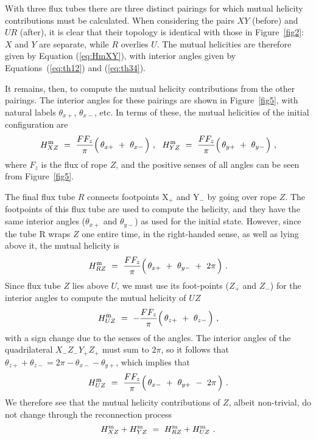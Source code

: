 \documentclass[10pt,namedreferneces]{SolarPhysics}
\begin{document}
\begin{article}
With three flux tubes there are three distinct pairings for which mutual helicity contributions must be calculated.  When considering the pairs $XY$ (before) and $UR$ (after), it is clear that their  topology is identical with those in Figure\ \ref{fig2}: $X$ and $Y$ are separate, while $R$ overlies $U$.  The mutual helicities are therefore given by Equation  (\ref{eq:HmXY}), with interior angles given by Equations\ (\ref{eq:th12}) and (\ref{eq:th34}).  

It remains, then, to compute the mutual helicity contributions from the other pairings.  The interior angles for these pairings are shown in Figure\ \ref{fig5}, with natural labels $\theta_{x+}$, $\theta_{x-}$, etc.  In terms of these, the mutual helicities of the initial configuration are
\begin{equation}
  H^{\rm m}_{XZ} ~=~{FF_z\over \pi}\Bigl(\, \theta_{x+} ~+~ \theta_{x-}\,\Bigr) ~,~~
  H^{\rm m}_{YZ} ~=~{FF_z\over \pi}\Bigl(\, \theta_{y+} ~+~ \theta_{y-}\,\Bigr) ~,
  	\label{eq:HmXZ}
\end{equation}
where $F_z$ is the flux of rope $Z$, and the positive senses of all angles can be seen from Figure\ \ref{fig5}.

The final flux tube $R$ connects footpoints X$_+$ and Y$_-$ by going over rope $Z$.  The footpoints of this flux tube are used to compute the helicity, and they have 
the same interior angles ($\theta_{x+}$ and $\theta_{y-}$) as used for the initial state.  However, since the tube R wraps $Z$ one entire time, in the right-handed sense, as well as lying above it, the mutual helicity is
\begin{equation} 
  H^{\rm m}_{RZ} ~=~{FF_z\over \pi}\Bigl(\, \theta_{x+} ~+~ \theta_{y-}~+~2\pi \,\Bigr) ~.
  	\label{eq:HmRZ}
\end{equation}
Since flux tube $Z$ lies above $U$, we must use its foot-points ($Z_+$ and $Z_-$) for the interior angles to compute the mutual helicity of $UZ$
\begin{equation}
  H^{\rm m}_{UZ} ~=~ -{FF_z\over \pi}\Bigl(\, \theta_{z+} ~+~ \theta_{z-}\,\Bigr) ~,
\end{equation}
with a sign change due to the senses of the angles.  The interior angles of the quadrilateral $X_-Z_-Y_+Z_+$ must sum to $2\pi$, so it follows that $\theta_{z+}+\theta_{z-}=2\pi-\theta_{x-}-\theta_{y+}$, which implies that
\begin{equation}
  H^{\rm m}_{UZ} ~=~{FF_z\over \pi}\Bigl(\, \theta_{x-} ~+~ \theta_{y+}~-~2\pi \,\Bigr) ~.
\end{equation}
We therefore see that the mutual helicity contributions of $Z$, albeit non-trivial, do not change through the reconnection process
\[
  H^{\rm m}_{XZ}+H^{\rm m}_{YZ} ~=~H^{\rm m}_{RZ}+H^{\rm m}_{UZ} ~.
\]


\end{article}
\end{document}
